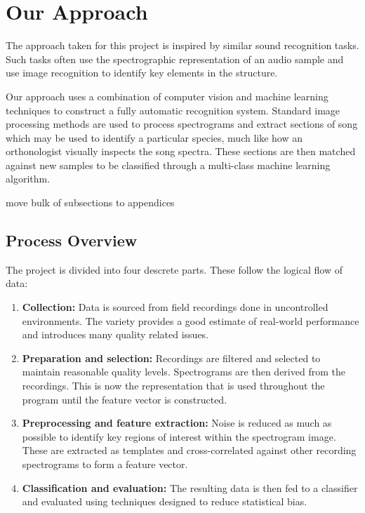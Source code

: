 \section{Our Approach}
The approach taken for this project is inspired by similar sound recognition
tasks.
Such tasks often use the spectrographic representation of an audio sample and
use image recognition to identify key elements in the structure.

Our approach uses a combination of computer vision and machine learning
techniques to construct a fully automatic recognition system.
Standard image processing methods are used to process spectrograms and extract
sections of song which may be used to identify a particular species, much like
how an orthonologist visually inspects the song spectra.
These sections are then matched against new samples to be classified through a
multi-class machine learning algorithm.

move bulk of subsections to appendices

\subsection{Process Overview}
The project is divided into four descrete parts.
These follow the logical flow of data:
\begin{enumerate}
  \item \textbf{Collection:}
    Data is sourced from field recordings done in uncontrolled environments.
    The variety provides a good estimate of real-world performance and
    introduces many quality related issues.

  \item \textbf{Preparation and selection:}
    Recordings are filtered and selected to maintain reasonable quality levels.
    Spectrograms are then derived from the recordings.
    This is now the representation that is used throughout the program until
    the feature vector is constructed.

  \item \textbf{Preprocessing and feature extraction:}
    Noise is reduced as much as possible to identify key regions of interest
    within the spectrogram image.
    These are extracted as templates and cross-correlated against other
    recording spectrograms to form a feature vector.

  \item \textbf{Classification and evaluation:}
    The resulting data is then fed to a classifier and evaluated using techniques
    designed to reduce statistical bias.
\end{enumerate}

